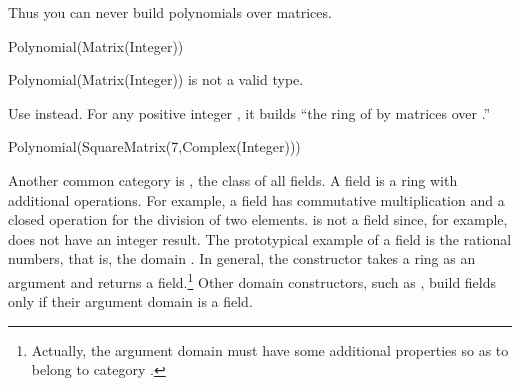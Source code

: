 \begin{xtc}
\begin{xtccomment}
Thus you can never build polynomials over matrices.
\end{xtccomment}
\begin{spadsrc}
Polynomial(Matrix(Integer))
\end{spadsrc}
\begin{MessageOutput}
   Polynomial(Matrix(Integer)) is not a valid type.
\end{MessageOutput}
\end{xtc}
\begin{xtc}
\begin{xtccomment}
Use  instead.
For any positive integer , it builds ``the ring of  by
 matrices over .''
\end{xtccomment}
\begin{spadsrc}
Polynomial(SquareMatrix(7,Complex(Integer)))
\end{spadsrc}
\begin{TeXOutput}
\begin{fricasmath}{7}
%
\end{fricasmath}
\end{TeXOutput}
\end{xtc}

Another common category is , the class of all fields.
A field is a ring with additional operations.
For example, a field has commutative multiplication and
a closed operation  for the
division of two elements.
 is not a field since, for example,  does not
have an integer result.
The prototypical example of a field is the rational numbers, that is, the
domain .
In general, the constructor  takes a ring as an
argument and returns a field.\footnote{Actually,
the argument domain must have some additional
properties so as to belong to category .}
Other domain constructors, such as , build fields only if
their argument domain is a field.

